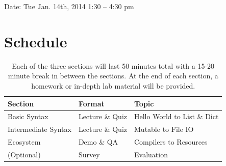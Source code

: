 \documentclass{tufte-handout}
\begin{document}
\noindent Date: Tue Jan. 14th, 2014  1:30 -- 4:30 pm

\section{Schedule}\label{sec:schedule}
\begin{table}[ht]
  \selectfont
  \begin{tabular}{lll}
    \toprule
    Section & Format & Topic \\
    \midrule
    Basic Syntax & Lecture \& Quiz & Hello World to List \& Dict \\
    Intermediate Syntax & Lecture \& Quiz & Mutable to File IO \\
    Ecosystem & Demo \& QA & Compilers to Resources \\
    (Optional) & Survey & Evaluation \\
    \bottomrule
  \end{tabular}
  \caption{Each of the three sections will last 50 minutes total with a
    15-20 minute break in between the sections. At the end of each
    section, a homework or in-depth lab material will be provided.}
  \label{tab:Schedule}
\end{table}
\end{document}
